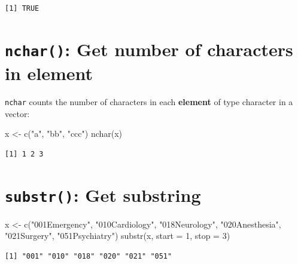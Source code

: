 \documentclass[
]{book}
\newenvironment{Shaded}{\begin{snugshade}}{\end{snugshade}}
\newcommand{\AttributeTok}[1]{\textcolor[rgb]{0.77,0.63,0.00}{#1}}
\newcommand{\DecValTok}[1]{\textcolor[rgb]{0.00,0.00,0.81}{#1}}
\newcommand{\FunctionTok}[1]{\textcolor[rgb]{0.00,0.00,0.00}{#1}}
\newcommand{\NormalTok}[1]{#1}
\newcommand{\OtherTok}[1]{\textcolor[rgb]{0.56,0.35,0.01}{#1}}
\newcommand{\StringTok}[1]{\textcolor[rgb]{0.31,0.60,0.02}{#1}}
\begin{document}
\begin{verbatim}
[1] TRUE
\end{verbatim}

\hypertarget{nchar-get-number-of-characters-in-element}{%
\section{\texorpdfstring{\texttt{nchar()}: Get number of characters in element}{nchar(): Get number of characters in element}}\label{nchar-get-number-of-characters-in-element}}

\texttt{nchar} counts the number of characters in each \textbf{element} of type character in a vector:

\begin{Shaded}
\begin{Highlighting}[]
\NormalTok{x }\OtherTok{\textless{}{-}} \FunctionTok{c}\NormalTok{(}\StringTok{"a"}\NormalTok{, }\StringTok{"bb"}\NormalTok{, }\StringTok{"ccc"}\NormalTok{)}
\FunctionTok{nchar}\NormalTok{(x)}
\end{Highlighting}
\end{Shaded}

\begin{verbatim}
[1] 1 2 3
\end{verbatim}

\hypertarget{substr-get-substring}{%
\section{\texorpdfstring{\texttt{substr()}: Get substring}{substr(): Get substring}}\label{substr-get-substring}}

\begin{Shaded}
\begin{Highlighting}[]
\NormalTok{x }\OtherTok{\textless{}{-}} \FunctionTok{c}\NormalTok{(}\StringTok{"001Emergency"}\NormalTok{, }\StringTok{"010Cardiology"}\NormalTok{, }\StringTok{"018Neurology"}\NormalTok{, }
       \StringTok{"020Anesthesia"}\NormalTok{, }\StringTok{"021Surgery"}\NormalTok{, }\StringTok{"051Psychiatry"}\NormalTok{)}
\FunctionTok{substr}\NormalTok{(x, }\AttributeTok{start =} \DecValTok{1}\NormalTok{, }\AttributeTok{stop =} \DecValTok{3}\NormalTok{)}
\end{Highlighting}
\end{Shaded}

\begin{verbatim}
[1] "001" "010" "018" "020" "021" "051"
\end{verbatim}
\end{document}

